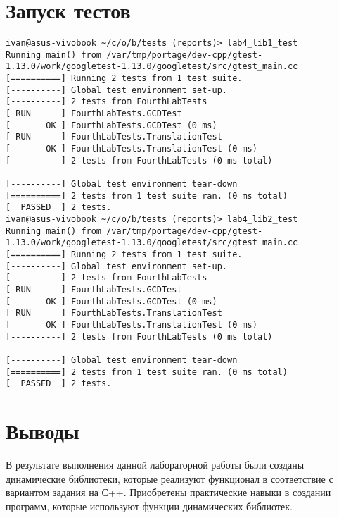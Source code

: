 \documentclass[a4paper, 12pt]{article}
\begin{document}
\section{Запуск тестов}
\begin{verbatim}
ivan@asus-vivobook ~/c/o/b/tests (reports)> lab4_lib1_test
Running main() from /var/tmp/portage/dev-cpp/gtest-1.13.0/work/googletest-1.13.0/googletest/src/gtest_main.cc
[==========] Running 2 tests from 1 test suite.
[----------] Global test environment set-up.
[----------] 2 tests from FourthLabTests
[ RUN      ] FourthLabTests.GCDTest
[       OK ] FourthLabTests.GCDTest (0 ms)
[ RUN      ] FourthLabTests.TranslationTest
[       OK ] FourthLabTests.TranslationTest (0 ms)
[----------] 2 tests from FourthLabTests (0 ms total)

[----------] Global test environment tear-down
[==========] 2 tests from 1 test suite ran. (0 ms total)
[  PASSED  ] 2 tests.
ivan@asus-vivobook ~/c/o/b/tests (reports)> lab4_lib2_test
Running main() from /var/tmp/portage/dev-cpp/gtest-1.13.0/work/googletest-1.13.0/googletest/src/gtest_main.cc
[==========] Running 2 tests from 1 test suite.
[----------] Global test environment set-up.
[----------] 2 tests from FourthLabTests
[ RUN      ] FourthLabTests.GCDTest
[       OK ] FourthLabTests.GCDTest (0 ms)
[ RUN      ] FourthLabTests.TranslationTest
[       OK ] FourthLabTests.TranslationTest (0 ms)
[----------] 2 tests from FourthLabTests (0 ms total)

[----------] Global test environment tear-down
[==========] 2 tests from 1 test suite ran. (0 ms total)
[  PASSED  ] 2 tests.
\end{verbatim}
\newpage

\section{Выводы}

В результате выполнения данной лабораторной работы были созданы динамические библиотеки, которые реализуют функционал в соответствие с вариантом задания на С++. Приобретены практические навыки в создании программ, которые используют функции динамических библиотек.
\end{document}
